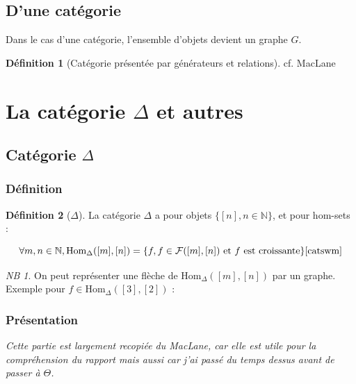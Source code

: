 \documentclass{article}
\theoremstyle{definition}
\theoremstyle{definition}
\newtheorem{definition}{Définition}[section]
\theoremstyle{remark}
\newtheorem{notabene}{NB}[section]
\begin{document}
\subsection{D'une catégorie}
Dans le cas d'une catégorie, l'ensemble d'objets devient un graphe $G$.
\begin{definition}[Catégorie présentée par générateurs et relations]
cf. MacLane\cite{catswm}
\end{definition}

\section{La catégorie $\Delta$ et autres}
\subsection{Catégorie $\Delta$}
\subsubsection{Définition}

\begin{definition}[$\Delta$]
La catégorie $\Delta$ a pour objets $\{[n], n \in \mathbb N\}$, et pour hom-sets :

$$
\forall m, n \in \mathbb N, \text{Hom}_\Delta([m],[n]) = \{f, f\in \mathcal F([m], [n]) \text{ et }f\text{ est croissante}\}\cite{catswm}
$$
\end{definition}

\begin{notabene}
On peut représenter une flèche de $\text{Hom}_\Delta([m], [n])$ par un graphe. Exemple pour $f \in \text{Hom}_\Delta([3],[2])$ :

\end{notabene}

\subsubsection{Présentation}
\textit{Cette partie est largement recopiée du MacLane\cite{catswm}, car elle est utile pour la compréhension du rapport mais aussi car j'ai passé du temps dessus avant de passer à $\Theta$.}
\end{document}
